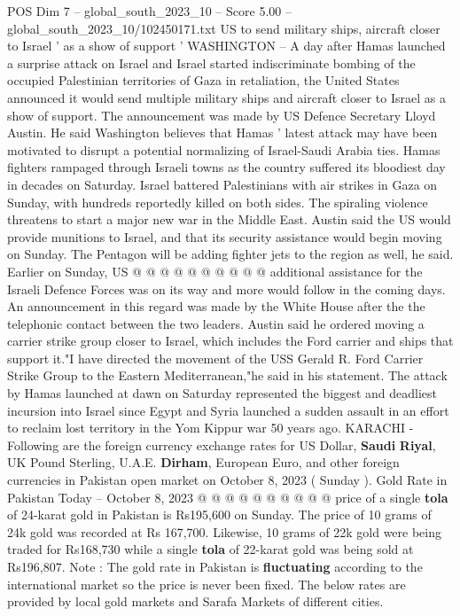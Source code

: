 \begin{textsample}{POS Dim 7 – global\_south\_2023\_10 – Score 5.00 – global\_south\_2023\_10/102450171.txt}  \label{ex:f7_pos_136}
US to send military ships, aircraft closer to Israel ' as a show of support ' WASHINGTON -- A day after Hamas launched a surprise attack on Israel and Israel started indiscriminate bombing of the occupied Palestinian territories of Gaza in retaliation, the United States announced it would send multiple military ships and aircraft closer to Israel as a show of support.
The announcement was made by US Defence Secretary Lloyd Austin.
He said Washington believes that Hamas ' latest attack may have been motivated to disrupt a potential normalizing of Israel-Saudi Arabia ties.
Hamas fighters rampaged through Israeli towns as the country suffered its bloodiest day in decades on Saturday.
Israel battered Palestinians with air strikes in Gaza on Sunday, with hundreds reportedly killed on both sides.
The spiraling violence threatens to start a major new war in the Middle East.
Austin said the US would provide munitions to Israel, and that its security assistance would begin moving on Sunday.
The Pentagon will be adding fighter jets to the region as well, he said.
Earlier on Sunday, US @ @ @ @ @ @ @ @ @ @ additional assistance for the Israeli Defence Forces was on its way and more would follow in the coming days.
An announcement in this regard was made by the White House after the the telephonic contact between the two leaders.
Austin said he ordered moving a carrier strike group closer to Israel, which includes the Ford carrier and ships that support it."I have directed the movement of the USS Gerald R.
Ford Carrier Strike Group to the Eastern Mediterranean,"he said in his statement.
The attack by Hamas launched at dawn on Saturday represented the biggest and deadliest incursion into Israel since Egypt and Syria launched a sudden assault in an effort to reclaim lost territory in the Yom Kippur war 50 years ago.
KARACHI - Following are the foreign currency exchange rates for US Dollar, \textbf{Saudi} \textbf{Riyal}, UK Pound Sterling, U.A.E. \textbf{Dirham}, European Euro, and other foreign currencies in Pakistan open market on October 8, 2023 ( Sunday ).
Gold Rate in Pakistan Today -- October 8, 2023 @ @ @ @ @ @ @ @ @ @ price of a single \textbf{tola} of 24-karat gold in Pakistan is Rs195,600 on Sunday.
The price of 10 grams of 24k gold was recorded at Rs 167,700.
Likewise, 10 grams of 22k gold were being traded for Rs168,730 while a single \textbf{tola} of 22-karat gold was being sold at Rs196,807.
Note : The gold rate in Pakistan is \textbf{fluctuating} according to the international market so the price is never been fixed.
The below rates are provided by local gold markets and Sarafa Markets of different cities.

\end{textsample}
